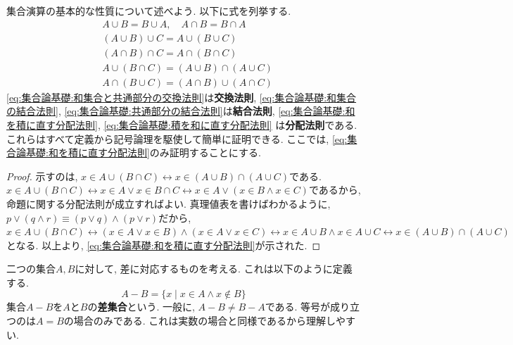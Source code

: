 \documentclass[a4j,dvipdfmx]{jsarticle}
\numberwithin{equation}{section}
\begin{document}
            集合演算の基本的な性質について述べよう. 以下に式を列挙する.
            \begin{align}
                &A\cup B = B \cup A, \quad A \cap B = B \cap A \label{eq:集合論基礎:和集合と共通部分の交換法則}\\
                &(A\cup B)\cup C = A\cup (B \cup C) \label{eq:集合論基礎:和集合の結合法則}\\
                &(A\cap B)\cap C = A\cap (B \cap C) \label{eq:集合論基礎:共通部分の結合法則}\\
                &A\cup (B \cap C) = (A\cup B) \cap (A\cup C)\label{eq:集合論基礎:和を積に直す分配法則}\\
                &A\cap (B \cup C) = (A\cap B) \cup (A\cap C)\label{eq:集合論基礎:積を和に直す分配法則}
            \end{align}
            \eqref{eq:集合論基礎:和集合と共通部分の交換法則}は\textbf{交換法則}, \eqref{eq:集合論基礎:和集合の結合法則}, \eqref{eq:集合論基礎:共通部分の結合法則}は\textbf{結合法則}, \eqref{eq:集合論基礎:和を積に直す分配法則}, \eqref{eq:集合論基礎:積を和に直す分配法則}
            は\textbf{分配法則}である. これらはすべて定義から記号論理を駆使して簡単に証明できる. ここでは, \eqref{eq:集合論基礎:和を積に直す分配法則}のみ証明することにする.
            \begin{proof}
                示すのは, $x\in A\cup (B \cap C) \leftrightarrow x\in (A\cup B) \cap (A\cup C)$である.
                $x\in A\cup (B \cap C) \leftrightarrow x\in A \lor x\in B\cap C \leftrightarrow x\in A \lor (x\in B \land x\in C)$であるから, 命題に関する分配法則が成立すればよい.
                真理値表を書けばわかるように, $p\lor (q\land r)\equiv (p\lor q) \land (p\lor r)$だから, $x\in A\cup (B \cap C) \leftrightarrow (x\in A\lor x\in B)\land (x\in A\lor x\in C)\leftrightarrow x\in A\cup B\land x\in A\cup C\leftrightarrow x\in (A\cup B)\cap (A\cup C)$
                となる. 以上より, \eqref{eq:集合論基礎:和を積に直す分配法則}が示された.
            \end{proof}

            二つの集合$A,B$に対して, 差に対応するものを考える. これは以下のように定義する.
            \begin{equation}
                A-B = \{x\mid x\in A \land x\not\in B\} \label{eq:集合論基礎:差集合の定義}
            \end{equation}
            集合$A-B$を$A$と$B$の\textbf{差集合}という. 一般に, $A-B\neq B-A$である. 等号が成り立つのは$A=B$の場合のみである. これは実数の場合と同様であるから理解しやすい.\\
\end{document}
